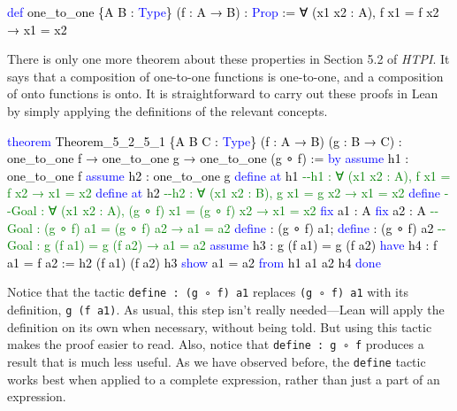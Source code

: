 \documentclass[
  letterpaper,
  DIV=11,
  numbers=noendperiod]{scrreprt}
\newenvironment{Shaded}{\begin{snugshade}}{\end{snugshade}}
\newcommand{\CommentTok}[1]{\textcolor[rgb]{0.37,0.37,0.37}{#1}}
\newcommand{\KeywordTok}[1]{\textcolor[rgb]{0.00,0.23,0.31}{#1}}
\newcommand{\NormalTok}[1]{\textcolor[rgb]{0.00,0.23,0.31}{#1}}
\renewcommand{\NormalTok}[1]{\textcolor[HTML]{000000}{#1}}
\renewcommand{\KeywordTok}[1]{\textcolor[HTML]{0000FF}{#1}}
\renewcommand{\CommentTok}[1]{\textcolor[HTML]{008000}{#1}}
\theoremstyle{remark}
\begin{document}
\begin{Shaded}
\begin{Highlighting}[]
\KeywordTok{def}\NormalTok{ one\_to\_one \{A B : }\KeywordTok{Type}\NormalTok{\} (f : A → B) : }\KeywordTok{Prop}\NormalTok{ :=}
\NormalTok{  ∀ (x1 x2 : A), f x1 = f x2 → x1 = x2}
\end{Highlighting}
\end{Shaded}

There is only one more theorem about these properties in Section 5.2 of
\emph{HTPI}. It says that a composition of one-to-one functions is
one-to-one, and a composition of onto functions is onto. It is
straightforward to carry out these proofs in Lean by simply applying the
definitions of the relevant concepts.

\begin{Shaded}
\begin{Highlighting}[]
\KeywordTok{theorem}\NormalTok{ Theorem\_5\_2\_5\_1 \{A B C : }\KeywordTok{Type}\NormalTok{\} (f : A → B) (g : B → C) :}
\NormalTok{    one\_to\_one f → one\_to\_one g → one\_to\_one (g ∘ f) := }\KeywordTok{by}
  \KeywordTok{assume}\NormalTok{ h1 : one\_to\_one f}
  \KeywordTok{assume}\NormalTok{ h2 : one\_to\_one g}
  \KeywordTok{define} \KeywordTok{at}\NormalTok{ h1  }\CommentTok{{-}{-}h1 : ∀ (x1 x2 : A), f x1 = f x2 → x1 = x2}
  \KeywordTok{define} \KeywordTok{at}\NormalTok{ h2  }\CommentTok{{-}{-}h2 : ∀ (x1 x2 : B), g x1 = g x2 → x1 = x2}
  \KeywordTok{define}        \CommentTok{{-}{-}Goal : ∀ (x1 x2 : A), (g ∘ f) x1 = (g ∘ f) x2 → x1 = x2}
  \KeywordTok{fix}\NormalTok{ a1 : A}
  \KeywordTok{fix}\NormalTok{ a2 : A    }\CommentTok{{-}{-}Goal : (g ∘ f) a1 = (g ∘ f) a2 → a1 = a2}
  \KeywordTok{define}\NormalTok{ : (g ∘ f) a1; }\KeywordTok{define}\NormalTok{ : (g ∘ f) a2}
                \CommentTok{{-}{-}Goal : g (f a1) = g (f a2) → a1 = a2}
  \KeywordTok{assume}\NormalTok{ h3 : g (f a1) = g (f a2)}
  \KeywordTok{have}\NormalTok{ h4 : f a1 = f a2 := h2 (f a1) (f a2) h3}
  \KeywordTok{show}\NormalTok{ a1 = a2 }\KeywordTok{from}\NormalTok{ h1 a1 a2 h4}
  \KeywordTok{done}
\end{Highlighting}
\end{Shaded}

Notice that the tactic \texttt{define\ :\ (g\ ∘\ f)\ a1} replaces
\texttt{(g\ ∘\ f)\ a1} with its definition, \texttt{g\ (f\ a1)}. As
usual, this step isn't really needed---Lean will apply the definition on
its own when necessary, without being told. But using this tactic makes
the proof easier to read. Also, notice that \texttt{define\ :\ g\ ∘\ f}
produces a result that is much less useful. As we have observed before,
the \texttt{define} tactic works best when applied to a complete
expression, rather than just a part of an expression.
\end{document}

